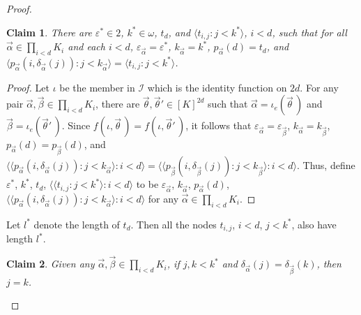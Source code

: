 \documentclass{amsart}
\newtheorem{claim}{Claim}
\theoremstyle{remark}
\theoremstyle{definition}
\theoremstyle{remark}
\newcommand{\al}{\alpha}
\newcommand{\om}{\omega}
\newcommand{\lgl}{\langle}
\newcommand{\rgl}{\rangle}
\begin{document}
\begin{proof}
\begin{claim}\label{claim.onetypes}
There are $\varepsilon^*\in 2$, $k^*\in\om$, $t_d$,
and $ \lgl t_{i,j}: j<k^*\rgl$, $i< d$,
 such that
for all $\vec{\al}\in \prod_{i<d}K_i$ and  each $i< d$,
 $\varepsilon_{\vec{\al}}=\varepsilon^*$,
$k_{\vec\al}=k^*$,  $p_{\vec{\al}}(d)=t_d$, and
$\lgl p_{\vec\al}(i,\delta_{\vec\al}(j)):j<k_{\vec\al}\rgl
=
 \lgl t_{i,j}: j<k^*\rgl$.
\end{claim}


\begin{proof}
Let  $\iota$ be the member in $\mathcal{I}$
which is the identity function on $2d$.
For any pair $\vec{\al},\vec{\beta}\in \prod_{i<d}K_i$, there are $\vec\theta,\vec\theta'\in [K]^{2d}$
such that
$\vec\al=\iota_e(\vec\theta\,)$ and $\vec\beta=\iota_e(\vec\theta'\,)$.
Since $f(\iota,\vec\theta\,)=f(\iota,\vec\theta'\,)$,
it follows that $\varepsilon_{\vec\al}=\varepsilon_{\vec\beta}$, $k_{\vec{\al}}=k_{\vec{\beta}}$, $p_{\vec{\al}}(d)=p_{\vec{\beta}}(d)$,
and $\lgl \lgl p_{\vec{\al}}(i,\delta_{\vec{\al}}(j)):j<k_{\vec{\al}}\rgl:i< d\rgl
=
\lgl \lgl p_{\vec{\beta}}(i,\delta_{\vec{\beta}}(j)):j<k_{\vec{\beta}}\rgl:i< d\rgl$.
Thus, define  $\varepsilon^*$, $k^*$, $t_d$, $\lgl \lgl t_{i,j}:j<k^*\rgl:i<d\rgl$ to be
$\varepsilon_{\vec\al}$, $k_{\vec\al}$,
$p_{\vec\al}(d)$,
$\lgl \lgl p_{\vec{\al}}(i,\delta_{\vec{\al}}(j)):j<k_{\vec{\al}}\rgl:i< d\rgl$
 for any $\vec\al\in \prod_{i<d}K_i$.
\end{proof}


Let $l^*$ denote the length of $t_d$.
Then all the nodes  $t_{i,j}$,  $i< d$, $j<k^*$,   also  have  length $l^*$.




\begin{claim}\label{claim.j=j'}
Given any $\vec\al,\vec\beta\in \prod_{i<d}K_i$,
if $j,k<k^*$ and $\delta_{\vec\al}(j)=\delta_{\vec\beta}(k)$,
 then $j=k$.
\end{claim}



\end{proof}
\end{document}

